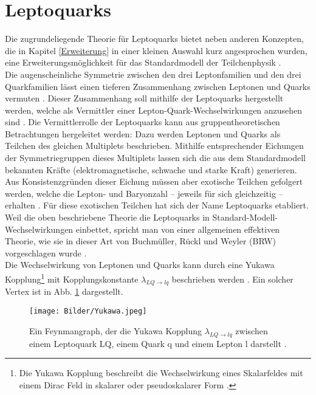 \section{Leptoquarks}\label{LQ}%
Die zugrundeliegende Theorie für Leptoquarks bietet neben anderen Konzepten, die in Kapitel \ref{Erweiterung} in einer kleinen Auswahl kurz angesprochen wurden, eine Erweiterungsmöglichkeit für das Standardmodell der Teilchenphysik \cite{LQATLAS}.\\
Die augenscheinliche Symmetrie zwischen den drei Leptonfamilien und den drei Quarkfamilien lässt einen tieferen Zusammenhang zwischen Leptonen und Quarks vermuten \cite{BUCHMULLER}. Dieser Zusammenhang soll mithilfe der Leptoquarks hergestellt werden, welche als Vermittler einer Lepton-Quark-Wechselwirkungen anzusehen sind \cite{Kuze}. Die Vermittlerrolle der Leptoquarks kann aus gruppentheoretischen Betrachtungen hergeleitet werden: Dazu werden Leptonen und Quarks als Teilchen des gleichen Multiplets beschrieben. Mithilfe entsprechender Eichungen der Symmetriegruppen dieses Multiplets lassen sich die aus dem Standardmodell bekannten Kräfte (elektromagnetische, schwache und starke Kraft) generieren. Aus Konsistenzgründen dieser Eichung müssen aber exotische Teilchen gefolgert werden, welche die Lepton- und Baryonzahl -- jeweils für sich gleichzeitig -- erhalten \cite{Salam}. Für diese exotischen Teilchen hat sich der Name Leptoquarks etabliert. Weil die oben beschriebene Theorie die Leptoquarks in Standard-Modell-Wechselwirkungen einbettet, spricht man von einer allgemeinen effektiven Theorie, wie sie in dieser Art von Buchmüller, Rückl und Weyler (BRW) vorgeschlagen wurde \cite{LMU_DR}.\\
Die Wechselwirkung von Leptonen und Quarks kann durch eine Yukawa Kopplung\footnote{Die Yukawa Kopplung beschreibt die Wechselwirkung eines Skalarfeldes mit einem Dirac Feld in skalarer oder pseudoskalarer Form \cite{Peskin}.} mit Kopplungskonstante \(\lambda_{LQ\rightarrow lq}\) beschrieben werden \cite{Minireview}. Ein solcher Vertex ist in Abb. \ref{Yukawa} dargestellt. 
\begin{figure}[htbp]                                 
  \begin{center}                                       
  \texttt{[image: Bilder/Yukawa.jpeg]} 
   \caption[Ein Feynmangraph, der die Yukawa Kopplung zwischen einem Leptoquark LQ, einem Quark q und einem Lepton l darstellt]{Ein Feynmangraph, der die Yukawa Kopplung $\lambda_{LQ\rightarrow lq}$ zwischen einem Leptoquark LQ, einem Quark q und einem Lepton l darstellt \cite{LQATLAS}.}
   \label{Yukawa}                                     
   \end{center}
\end{figure}
